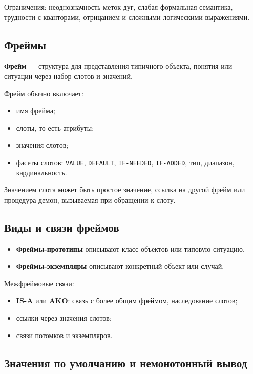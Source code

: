 Ограничения: неоднозначность меток дуг, слабая формальная семантика, трудности с кванторами, отрицанием и сложными логическими выражениями.

\subsection*{Фреймы}

\textbf{Фрейм} --- структура для представления типичного объекта, понятия или ситуации через набор слотов и значений.

Фрейм обычно включает:
\begin{itemize}
    \item имя фрейма;
    \item слоты, то есть атрибуты;
    \item значения слотов;
    \item фасеты слотов: \texttt{VALUE}, \texttt{DEFAULT}, \texttt{IF-NEEDED}, \texttt{IF-ADDED}, тип, диапазон, кардинальность.
\end{itemize}

Значением слота может быть простое значение, ссылка на другой фрейм или процедура-демон, вызываемая при обращении к слоту.

\subsection*{Виды и связи фреймов}

\begin{itemize}
    \item \textbf{Фреймы-прототипы} описывают класс объектов или типовую ситуацию.
    \item \textbf{Фреймы-экземпляры} описывают конкретный объект или случай.
\end{itemize}

Межфреймовые связи:
\begin{itemize}
    \item \textbf{IS-A} или \textbf{AKO}: связь с более общим фреймом, наследование слотов;
    \item ссылки через значения слотов;
    \item связи потомков и экземпляров.
\end{itemize}

\subsection*{Значения по умолчанию и немонотонный вывод}

